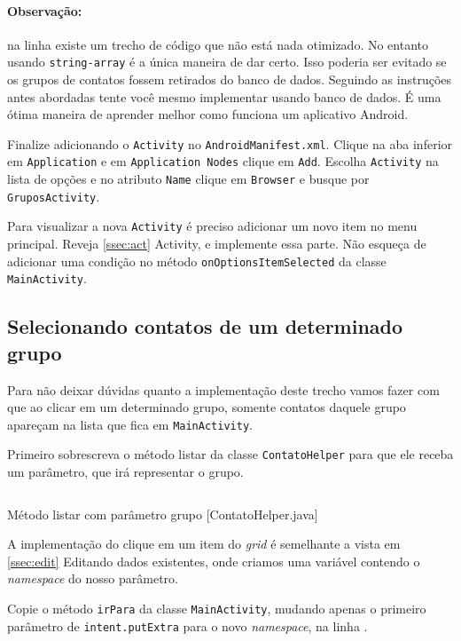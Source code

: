 \paragraph{Observação:}

na linha  existe um trecho de código que não está nada
otimizado. No entanto usando \texttt{string-array} é a única maneira de
dar certo. Isso poderia ser evitado se os grupos de contatos fossem
retirados do banco de dados. Seguindo as instruções antes abordadas
tente você mesmo implementar usando banco de dados. É uma ótima maneira
de aprender melhor como funciona um aplicativo Android.

Finalize adicionando o \texttt{Activity} no
\texttt{AndroidManifest.xml}. Clique na aba inferior em
\texttt{Application} e em \texttt{Application Nodes} clique em
\texttt{Add}. Escolha \texttt{Activity} na lista de opções e no atributo
\texttt{Name} clique em \texttt{Browser} e busque por
\texttt{GruposActivity}.

Para visualizar a nova \texttt{Activity} é preciso adicionar um novo
item no menu principal. Reveja \ref{ssec:act} Activity, e implemente
essa parte. Não esqueça de adicionar uma condição no método
\texttt{onOptionsItemSelected} da classe \texttt{MainActivity}.

\subsection{Selecionando contatos de um determinado grupo}

Para não deixar dúvidas quanto a implementação deste trecho vamos fazer
com que ao clicar em um determinado grupo, somente contatos daquele
grupo apareçam na lista que fica em \texttt{MainActivity}.

Primeiro sobrescreva o método listar da classe \texttt{ContatoHelper}
para que ele receba um parâmetro, que irá representar o grupo.

\begin{listing}[H]
  \inputminted[linenos=true,frame=bottomline,tabsize=3]{ java }{ source/ContatoHelper-8.java }
  \caption{Método listar com parâmetro grupo [ContatoHelper.java]}
\end{listing}

A implementação do clique em um item do \emph{grid} é semelhante a vista
em \ref{ssec:edit} Editando dados existentes, onde criamos uma variável
contendo o \emph{namespace} do nosso parâmetro.

Copie o método \texttt{irPara} da classe \texttt{MainActivity}, mudando
apenas o primeiro parâmetro de \texttt{intent.putExtra} para o novo
\emph{namespace}, na linha .

